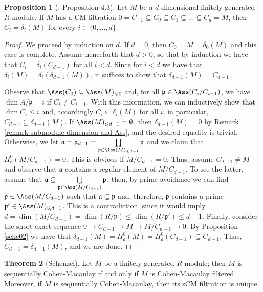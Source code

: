 \documentclass[12pt]{amsart}
\theoremstyle{definition}
\newtheorem{theorem}{Theorem}[section]
\newtheorem{proposition}[theorem]{Proposition}
\theoremstyle{definition}
\def\frk{\mathfrak}               %
\def\aa{{\frk a}}
\def\pp{{\frk p}}
\renewcommand{\leq}{\leqslant}
\let\lra\longrightarrow
\begin{document}
  \begin{proposition}[\cite{Sch99}, Proposition 4.3]\label{CMFvsDF}
Let $M$ be a $d$-dimensional finitely generated $R$-module. If $M$ has a CM filtration $0=C_{-1}\subseteq C_0\subseteq C_1\subseteq \ldots \subseteq C_d=M$, then $C_i = \delta_i(M)$ for every $i \in \{0,\ldots,d\}$.
  \end{proposition}
  \begin{proof}
We proceed by induction on $d$. If $d=0$, then $C_0=M=\delta_0(M)$ and this case is  complete. Assume henceforth that $d>0$, so that by induction we have that $C_i=\delta_i(C_{d-1})$  for all $i<d$. Since for $i<d$ we have that $\delta_i(M) = \delta_i(\delta_{d-1}(M))$, it suffices to show that $\delta_{d-1}(M) = C_{d-1}$.

Observe that $\Ass(C_0)\subseteq \Ass(M)_{\leq 0}$ and, for all $\pp\in\Ass(C_i/C_{i-1})$, we have $\dim A/\pp=i$ if $C_i\neq C_{i-1}$. With this information, we can inductively show that $\dim C_i\leq i$ and, accordingly  $C_i\subseteq \delta_i(M)$ for all $i$; in particular, $C_{d-1} \subseteq \delta_{d-1}(M)$. If $\Ass(M)_{\leq d-1} =\emptyset$, then $\delta_{d-1}(M) = 0$ by Remark \ref{remark submodule dimension and Ass}, and the desired equality is trivial. Otherwise,  we let
  $\aa=\aa_{d-1}=\prod\limits_{\pp\in \Ass(M)_{\leq d-1}} \pp$ and we claim that $H^0_\aa(M/C_{d-1}) = 0$. This is obvious if  $M/C_{d-1} =0$. Thus, assume $C_{d-1}\neq M$ and observe that $\aa$ contains a regular element of $M/C_{d-1}$. To see the latter, assume that $\aa \subseteq \bigcup\limits_{\pp\in\Ass(M/C_{d-1})}\pp$; then,  by prime avoidance we can find $\pp\in \Ass(M/C_{d-1})$ such that $\aa\subseteq\pp$ and, therefore,  $\pp$ contains a prime $\pp' \in \Ass(M)_{\leq d-1}$. This is a contradiction, since it would imply $d=\dim(M/C_{d-1}) = \dim(R/\pp) \leq \dim(R/\pp') \leq d-1$.
Finally, consider the short exact sequence $0\lra C_{d-1} \lra M \lra M/C_{d-1} \lra 0$. By Proposition \ref{sche02} we have that $\delta_{d-1}(M) = H^0_{\aa}(M)  = H^0_{\aa}(C_{d-1}) \subseteq C_{d-1}$. Thus, $C_{d-1} = \delta_{d-1}(M)$, and we are done.
  \end{proof}
  
\begin{theorem}[Schenzel] \label{thm sCM and CMf}
Let $M$ be a finitely generated $R$-module; then  $M$ is sequentially Cohen-Macaulay if and only if $M$ is Cohen-Macaulay filtered. Moreover, if $M$ is sequentially Cohen-Macaulay, then its sCM filtration is unique.
\end{theorem}
\end{document}

